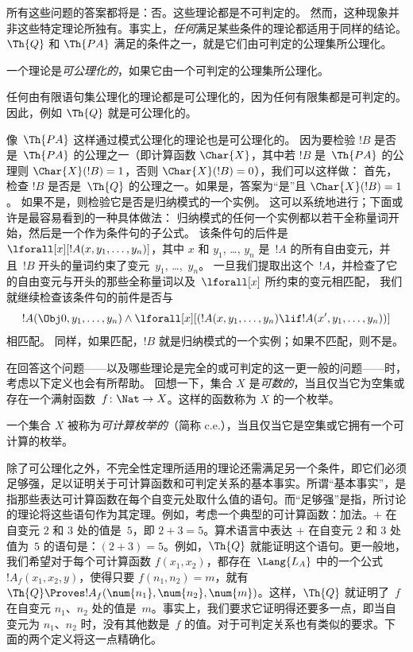 \documentclass[../../../include/open-logic-section]{subfiles}
\begin{document}
所有这些问题的答案都将是：否。这些理论都是不可判定的。
然而，这种现象并非这些特定理论所独有。事实上，\emph{任何}满足某些条件的理论都适用于同样的结论。
$\Th{Q}$ 和 $\Th{PA}$ 满足的条件之一，就是它们由可判定的公理集所公理化。

\begin{defn}
一个理论是\emph{可公理化的}，如果它由一个可判定的公理集所公理化。
\end{defn}

\begin{ex}
任何由有限语句集公理化的理论都是可公理化的，因为任何有限集都是可判定的。
因此，例如 $\Th{Q}$ 就是可公理化的。

像~$\Th{PA}$ 这样通过模式公理化的理论也是可公理化的。
因为要检验 $!B$ 是否是~$\Th{PA}$ 的公理之一（即计算函数 $\Char{X}$，其中若 $!B$ 是~$\Th{PA}$ 的公理则 $\Char{X}(!B) = 1$，否则 $\Char{X}(!B) = 0$），我们可以这样做：
首先，检查 $!B$ 是否是~$\Th{Q}$ 的公理之一。如果是，答案为“是”且 $\Char{X}(!B) = 1$。
如果不是，则检验它是否是归纳模式的一个实例。
这可以系统地进行；下面或许是最容易看到的一种具体做法：
归纳模式的任何一个实例都以若干全称量词开始，然后是一个作为条件句的子公式。
该条件句的后件是 $\lforall[x][!A(x, y_1, \dots, y_n)]$，其中 $x$ 和 $y_1$, \dots, $y_n$ 是~$!A$ 的所有自由变元，并且~$!B$ 开头的量词约束了变元~$y_1$, \dots,~$y_n$。
一旦我们提取出这个~$!A$，并检查了它的自由变元与开头的那些全称量词以及~$\lforall[x]$ 所约束的变元相匹配，
我们就继续检查该条件句的前件是否与 \[
!A(\Obj 0, y_1, \dots, y_n) \land \lforall[x][(!A(x, y_1, \dots, y_n)
\lif !A(x', y_1, \dots, y_n))]
\] 相匹配。
同样，如果匹配，$!B$ 就是归纳模式的一个实例；如果不匹配，则不是。
\end{ex}

在回答这个问题——以及哪些理论是完全的或可判定的这一更一般的问题——时，考虑以下定义也会有所帮助。
回想一下，集合 $X$ 是\emph{可数的}，当且仅当它为空集或存在一个满射函数~$f \colon \Nat \to X$。这样的函数称为 $X$ 的一个枚举。

\begin{defn}
一个集合 $X$ 被称为\emph{可计算枚举的}（简称 c.e.\@），当且仅当它是空集或它拥有一个可计算的枚举。
\end{defn}

除了可公理化之外，不完全性定理所适用的理论还需满足另一个条件，即它们必须足够强，足以证明关于可计算函数和可判定关系的基本事实。所谓“基本事实”，是指那些表达可计算函数在每个自变元处取什么值的语句。而“足够强”是指，所讨论的理论将这些语句作为其定理。例如，考虑一个典型的可计算函数：加法。$+$ 在自变元 $2$ 和 $3$ 处的值是~$5$，即 $2+3 = 5$。算术语言中表达 $+$ 在自变元 $2$ 和 $3$ 处值为~$5$ 的语句是：$(\num{2} + \num{3}) = \num{5}$。例如，$\Th{Q}$ 就能证明这个语句。更一般地，我们希望对于每个可计算函数 $f(x_1, x_2)$，都存在~$\Lang{L_A}$ 中的一个公式~$!A_f(x_1, x_2, y)$，使得只要 $f(n_1, n_2) =
m$，就有 $\Th{Q}
\Proves !A_f(\num{n_1}, \num{n_2}, \num{m})$。这样，$\Th{Q}$ 就证明了~$f$ 在自变元 $n_1$、$n_2$ 处的值是~$m$。事实上，我们要求它证明得还要多一点，即当自变元为 $n_1$、$n_2$ 时，没有其他数是~$f$ 的值。对于可判定关系也有类似的要求。下面的两个定义将这一点精确化。
\end{document}
